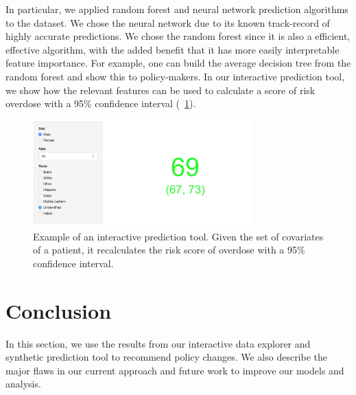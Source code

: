 \documentclass{article}
\begin{document}
In particular, we applied random forest and neural network prediction algorithms to the dataset. We chose the neural network due to its known track-record of highly accurate predictions. We chose the random forest since it is also a efficient, effective algorithm, with the added benefit that it has more easily interpretable feature importance. For example, one can build the average decision tree from the random forest and show this to policy-makers. In our interactive prediction tool, we show how the relevant features can be used to calculate a score of risk overdose with a 95\% confidence interval (~\ref{fig:predictor}).

\begin{figure}[h]
\centering
\includegraphics[width=0.75\textwidth]{predictor.png}
\caption{Example of an interactive prediction tool. Given the set of covariates of a patient, it recalculates the risk score of overdose with a 95\% confidence interval.}
\label{fig:predictor}
\end{figure}

\section{Conclusion}
In this section, we use the results from our interactive data explorer and synthetic prediction tool to recommend policy changes. We also describe the major flaws in our current approach and future work to improve our models and analysis.
\end{document}

